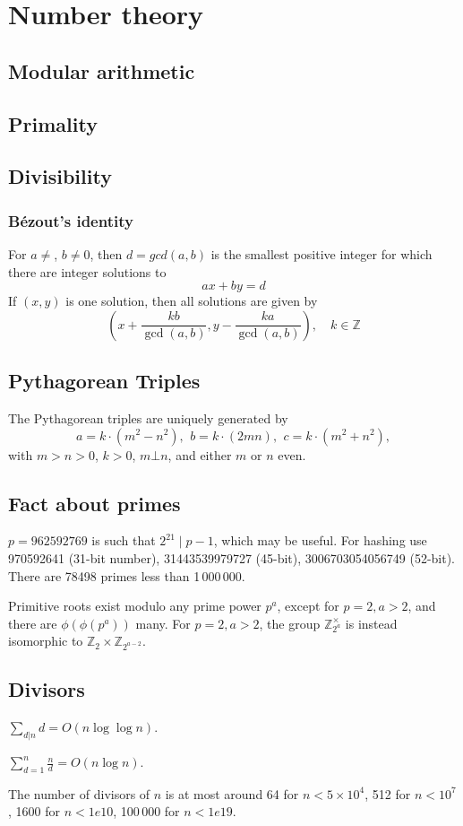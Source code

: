 \chapter{Number theory}

\section{Modular arithmetic}

\section{Primality}

\section{Divisibility}

	\subsection{Bézout's identity}
	For $a \neq $, $b \neq 0$, then $d=gcd(a,b)$ is the smallest positive integer for which there are integer solutions to
	$$ax+by=d$$
	If $(x,y)$ is one solution, then all solutions are given by
	$$\left(x+\frac{kb}{\gcd(a,b)}, y-\frac{ka}{\gcd(a,b)}\right), \quad k\in\mathbb{Z}$$


\section{Pythagorean Triples}
 The Pythagorean triples are uniquely generated by
 \[ a=k\cdot (m^{2}-n^{2}),\ \,b=k\cdot (2mn),\ \,c=k\cdot (m^{2}+n^{2}), \]
 with $m > n > 0$, $k > 0$, $m \bot n$, and either $m$ or $n$ even.

\section{Fact about primes}
	$p=962592769$ is such that $2^{21} \mid p-1$, which may be useful. For hashing
	use 970592641 (31-bit number), 31443539979727 (45-bit), 3006703054056749
	(52-bit). There are 78498 primes less than 1\,000\,000.

	Primitive roots exist modulo any prime power $p^a$, except for $p = 2, a > 2$, and there are $\phi(\phi(p^a))$ many.
	For $p = 2, a > 2$, the group $\mathbb Z_{2^a}^\times$ is instead isomorphic to $\mathbb Z_2 \times \mathbb Z_{2^{a-2}}$.

\section{Divisors}
	$\sum_{d|n} d = O(n \log \log n)$.

    $\sum_{d = 1} ^ {n} \frac{n}{d} = O(n \log n)$.

	The number of divisors of $n$ is at most around 64 for $n < 5 \times 10^4$, 512 for $n < 10^7$, 1600 for $n < 1e10$, 100\,000 for $n < 1e19$.

